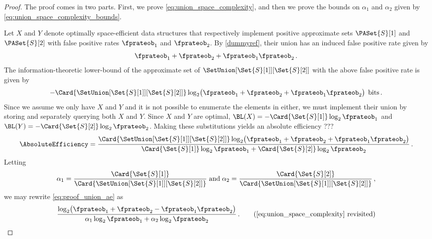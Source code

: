 \documentclass[ ../main.tex]{subfiles}
\begin{document}
\begin{proof}
The proof comes in two parts. First, we prove \cref{eq:union_space_complexity}, 
and then we prove the bounds on $\alpha_1$ and $\alpha_2$ given by 
\cref{eq:union_space_complexity_bounds}.

Let $X$ and $Y$ denote optimally space-efficient data structures that 
respectively implement positive approximate sets $\PASet{S}[1]$ and 
$\PASet{S}[2]$ with false positive rates $\fprateob_1$ and $\fprateob_2$. By 
\cref{dummyref}, their union has an induced false positive rate given by
\begin{equation}
    \fprateob_1 + \fprateob_2 + \fprateob_1 \fprateob_2\,.
\end{equation}
The information-theoretic lower-bound of the approximate set of 
$\SetUnion[\Set{S}[1]][\Set{S}[2]]$ with the above false positive rate is given 
by
\begin{equation}
    -\Card{\SetUnion[\Set{S}[1]][\Set{S}[2]]}
        \log_2 \! \left(\fprateob_1 + \fprateob_2 +
        \fprateob_1 \fprateob_2\right) \; \si{bits}\,.
\end{equation}
Since we assume we only have $X$ and $Y$ and it is not possible to enumerate the 
elements in either, we must implement their union by storing and separately 
querying both $X$ and $Y$. Since $X$ and $Y$ are optimal, 
$\BL(X) = -\Card{\Set{S}[1]} \log_2 \fprateob_1$ and 
$\BL(Y) = -\Card{\Set{S}[2]} \log_2 \fprateob_2$. 
Making these substitutions yields an absolute efficiency ???
\begin{equation}
\label{eq:proof_union_ae}
    \AbsoluteEfficiency = \frac{\Card{\SetUnion[\Set{S}[1]][\Set{S}[2]]} \log_2 \! \left(\fprateob_1 + \fprateob_2 + \fprateob_1 \fprateob_2\right)}{\Card{\Set{S}[1]} \log_2 \fprateob_1 + \Card{\Set{S}[2]} \log_2 \fprateob_2}\,.
\end{equation}
Letting
\begin{equation}
    \alpha_1 = \frac{\Card{\Set{S}[1]}}{\Card{\SetUnion[\Set{S}[1]][\Set{S}[2]]}} \; \text{and} \; \alpha_2 = \frac{\Card{\Set{S}[2]}}{\Card{\SetUnion[\Set{S}[1]][\Set{S}[2]]}}\,,
\end{equation}
we may rewrite \cref{eq:proof_union_ae} as
\begin{equation*}
    \frac{
        \log_2\!\left(\fprateob_1 + \fprateob_2 - \fprateob_1 \fprateob_2\right)}
    {
        \alpha_1 \log_2 \fprateob_1 + \alpha_2 \log_2 \fprateob_2
    }\,.\tag{\ref{eq:union_space_complexity} revisited}
\end{equation*}


\end{proof}
\end{document}
